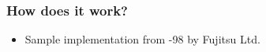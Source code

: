 \documentclass{beamer}
\begin{document}
\begin{frame}
  \frametitle{How does it work?}
  \begin{itemize}
  \item Sample implementation from -98 by Fujitsu Ltd.
  \end{itemize}
  \begin{figure}
    \begin{subfigure}{0.49\textwidth}
      \centering
      \noindent{}
    \end{subfigure}
    \begin{subfigure}{0.49\textwidth}
      \centering

\end{subfigure}
\end{figure}
\end{frame}
\end{document}
